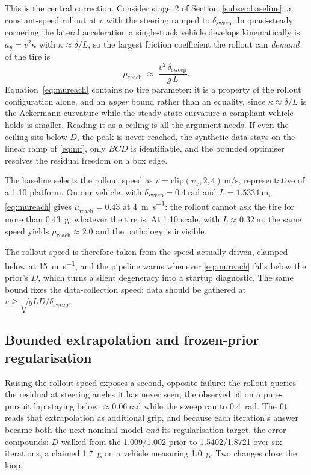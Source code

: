 This is the central correction. Consider stage~2 of
Section~\ref{subsec:baseline}: a constant-speed rollout at $v$ with the
steering ramped to $\delta_{\mathrm{sweep}}$. In quasi-steady cornering the
lateral acceleration a single-track vehicle develops kinematically is
$a_{y}=v^{2}\kappa$ with $\kappa\approx\delta/L$, so the largest friction
coefficient the rollout can \emph{demand} of the tire is
\begin{equation}
\mu_{\mathrm{reach}}\;\approx\;\frac{v^{2}\,\delta_{\mathrm{sweep}}}{g\,L}.
\label{eq:mureach}
\end{equation}
Equation~\eqref{eq:mureach} contains no tire parameter: it is a property of
the rollout configuration alone, and an \emph{upper} bound rather than an
equality, since $\kappa\approx\delta/L$ is the Ackermann curvature while the
steady-state curvature a compliant vehicle holds is smaller. Reading it as a ceiling
is all the argument needs. If even the ceiling sits below $D$, the peak is
never reached, the synthetic data stays on the linear ramp of \eqref{eq:mf},
only $BCD$ is identifiable, and the bounded optimiser resolves the residual
freedom on a box edge.

The baseline selects the rollout speed as
$v=\mathrm{clip}(\overline{v_{x}},2,4)\,\si{\meter\per\second}$, representative
of a 1:10 platform. On our vehicle, with
$\delta_{\mathrm{sweep}}=\SI{0.4}{\radian}$ and $L=\SI{1.5334}{\meter}$,
\eqref{eq:mureach} gives $\mu_{\mathrm{reach}}=0.43$ at
\SI{4}{\meter\per\second}: the rollout cannot ask the tire for more than
\SI{0.43}{\g}, whatever the tire is. At 1:10 scale, with
$L\approx\SI{0.32}{\meter}$, the same speed yields
$\mu_{\mathrm{reach}}\approx2.0$ and the pathology is invisible.

The rollout speed is therefore taken from the speed actually driven, clamped
below at \SI{15}{\meter\per\second}, and the pipeline warns whenever
\eqref{eq:mureach} falls below the prior's $D$, which turns a silent degeneracy
into a startup diagnostic. The same bound fixes the data-collection speed: data
should be gathered at $v\ge\sqrt{gLD/\delta_{\mathrm{sweep}}}$.

\subsection{Bounded extrapolation and frozen-prior regularisation}
\label{subsec:iterative}

Raising the rollout speed exposes a second, opposite failure: the rollout
queries the residual at steering angles it has never seen, the observed
$|\delta|$ on a pure-pursuit lap staying below $\approx\SI{0.06}{\radian}$
while the sweep ran to \SI{0.4}{\radian}. The fit reads that extrapolation as
additional grip, and because each iteration's answer became both the next
nominal model \emph{and} its regularisation target, the error compounds: $D$
walked
from the \num{1.009}/\num{1.002} prior to \num{1.5402}/\num{1.8721} over six
iterations, a claimed \SI{1.7}{\g} on a vehicle measuring \SI{1.0}{\g}. Two
changes close the loop.

